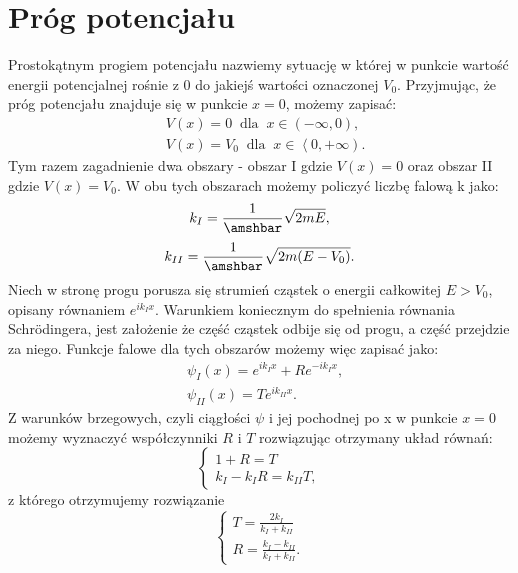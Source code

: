 \documentclass{SGGW-thesis}
\begin{document}
	\section{Próg potencjału}
	Prostokątnym progiem potencjału nazwiemy sytuację w której w punkcie wartość energii potencjalnej rośnie z $0$ do jakiejś wartości oznaczonej $V_0$. Przyjmując, że próg potencjału znajduje się w punkcie $x = 0 $, możemy zapisać:
	\begin{equation}
	\begin{split}
		&V(x) = 0 \;\; \textrm{dla} \;\; x \in \left(-\infty, 0\right), \\
		&V(x) = V_0 \;\; \textrm{dla} \;\; x \in \left<0, +\infty\right).
	\end{split}
	\end{equation}
Tym razem zagadnienie dwa obszary - obszar I gdzie $V(x)=0$ oraz obszar II gdzie $V(x)=V_0$. W obu tych obszarach możemy policzyć liczbę falową k jako:
	\begin{equation}
	k_I = \frac{1}{\amshbar}\sqrt{2mE}	,
	\end{equation}
	\begin{equation}
	k_{II} = \frac{1}{\amshbar}\sqrt{2m(E-V_0)}.
	\end{equation}
Niech w stronę progu porusza się strumień cząstek o energii całkowitej $E > V_0$, opisany równaniem $e^{ik_Ix}$. Warunkiem koniecznym do spełnienia równania Schrödingera, jest założenie że część cząstek odbije się od progu, a część przejdzie za niego. Funkcje falowe dla tych obszarów możemy więc zapisać jako:
	\begin{equation}\label{eqn:potential-jump-solution}
	\begin{split}
	&\psi_I(x) = e^{ik_Ix} + Re^{-ik_Ix}, \\
	&\psi_{II}(x) = Te^{ik_{II}x}.
	\end{split}
	\end{equation}
Z warunków brzegowych, czyli ciągłości $\psi$ i jej pochodnej po x w punkcie $x=0$ możemy wyznaczyć współczynniki $R$ i $T$ rozwiązując otrzymany układ równań:
	\begin{equation}
	\begin{cases}
	1+ R = T \\
	k_I-k_IR=k_{II}T,
	\end{cases}
	\end{equation}
z którego otrzymujemy rozwiązanie
	\begin{equation}
	\begin{cases}
	T = \frac{2k_I}{k_I+k_{II}} \\
	R = \frac{k_I-k_{II}}{k_I+k_{II}}.
	\end{cases}
	\end{equation}
\end{document}
